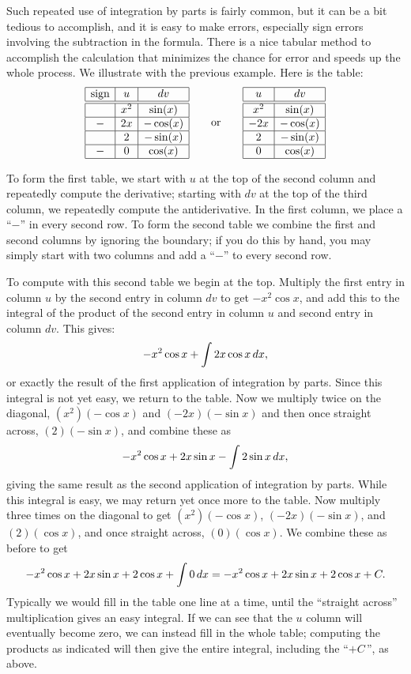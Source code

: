 Such repeated use of integration by parts is fairly common, but it can
be a bit tedious to accomplish, and it is easy to make
errors, especially sign errors involving the subtraction in the
formula. There is a nice tabular method to accomplish the calculation
that minimizes the chance for error and speeds up the whole
process. We illustrate with the previous example. Here is the
table:
\[
\begin{array}{|c|c|c|}\hline
\text{sign} & u & dv \\ \hline \hline
 & x^2 & \sin(x) \\ \hline
- & 2x & -\cos(x) \\ \hline
  & 2  & -\sin(x) \\ \hline
- & 0  & \cos(x) \\ \hline
\end{array}
\qquad\text{or}\qquad
\begin{array}{|c|c|}\hline
u & dv \\ \hline\hline
x^2 & \sin(x) \\ \hline 
-2x & -\cos(x) \\\hline
2 & -\sin(x)\\\hline
0 & \cos(x)\\\hline
\end{array}
\]

To form the first table, we start with $u$ at the top of the second
column and repeatedly compute the derivative; starting with $dv$ at
the top of the third column, we repeatedly compute the
antiderivative. In the first column, we place a ``$-$'' in every
second row. To form the 
second table we combine the first and second columns by
ignoring the boundary; if you do this by hand, you may simply start
with two columns and add a ``$-$'' to every second row.

To compute with this second table we begin at the top. Multiply the
first entry in column $u$ by the second entry in column $dv$ to get
$-x^2\cos x$, and add this to the integral of the product of the
second entry in column $u$ and second entry in column $dv$.  This
gives:
$$-x^2\cos x+\int 2x\cos x\, d x,$$
or exactly the result of the first application of integration by
parts.  Since this integral is not yet easy, we return to the table.
Now we multiply twice on the diagonal, $(x^2)(-\cos x)$ and
$(-2x)(-\sin x)$ and then once straight across, $(2)(-\sin x)$, and
combine these as
$$-x^2\cos x+2x\sin x-\int 2\sin x\, d x,$$
giving the same result as the second application of integration by
parts. While this integral is easy, we may return yet once more to the
table. Now multiply three times on the diagonal to get $
(x^2)(-\cos x)$, $(-2x)(-\sin x)$, and $(2)(\cos x)$, and once
straight across, $(0)(\cos x)$. We combine these as before to get
$$
  -x^2\cos x+2x\sin x +2\cos x+\int 0\, d x=
  -x^2\cos x+2x\sin x +2\cos x+C.
$$
Typically we would fill in the table one line at a time, until the
``straight across'' multiplication gives an easy integral. If we can
see that the $u$ column will eventually become zero, we can instead
fill in the whole table; computing the products as indicated will then
give the entire integral, including the ``$+C\,$'', as above.

